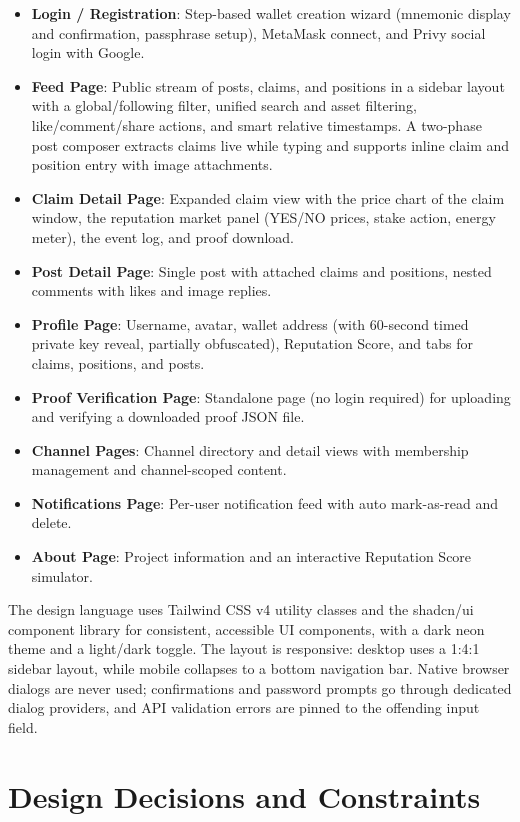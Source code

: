 \documentclass[a4paper,12pt]{report}
\begin{document}
\begin{itemize}
    \item \textbf{Login / Registration}: Step-based wallet creation wizard (mnemonic display and confirmation, passphrase setup), MetaMask connect, and Privy social login with Google.
    \item \textbf{Feed Page}: Public stream of posts, claims, and positions in a sidebar layout with a global/following filter, unified search and asset filtering, like/comment/share actions, and smart relative timestamps. A two-phase post composer extracts claims live while typing and supports inline claim and position entry with image attachments.
    \item \textbf{Claim Detail Page}: Expanded claim view with the price chart of the claim window, the reputation market panel (YES/NO prices, stake action, energy meter), the event log, and proof download.
    \item \textbf{Post Detail Page}: Single post with attached claims and positions, nested comments with likes and image replies.
    \item \textbf{Profile Page}: Username, avatar, wallet address (with 60-second timed private key reveal, partially obfuscated), Reputation Score, and tabs for claims, positions, and posts.
    \item \textbf{Proof Verification Page}: Standalone page (no login required) for uploading and verifying a downloaded proof JSON file.
    \item \textbf{Channel Pages}: Channel directory and detail views with membership management and channel-scoped content.
    \item \textbf{Notifications Page}: Per-user notification feed with auto mark-as-read and delete.
    \item \textbf{About Page}: Project information and an interactive Reputation Score simulator.
\end{itemize}

The design language uses Tailwind CSS v4 utility classes and the shadcn/ui component library for consistent, accessible UI components, with a dark neon theme and a light/dark toggle. The layout is responsive: desktop uses a 1:4:1 sidebar layout, while mobile collapses to a bottom navigation bar. Native browser dialogs are never used; confirmations and password prompts go through dedicated dialog providers, and API validation errors are pinned to the offending input field.

\clearpage
\section{Design Decisions and Constraints}
\end{document}

